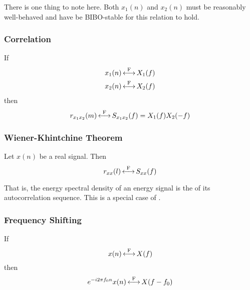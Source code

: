 \begin{remark*}
  There is one thing to note here.
  Both $x_{1}(n)$ and $x_{2}(n)$ must be reasonably well-behaved and have be BIBO-stable for this relation to hold.
\end{remark*}

\subsubsection{Correlation}\label{subsubsec:FourierTransformProperties-Correlation}
If
\begin{equation*}
  \begin{aligned}
    x_{1}(n) &\operatorname{\overset{F}{\longleftrightarrow}} X_{1}(f) \\
    x_{2}(n) &\operatorname{\overset{F}{\longleftrightarrow}} X_{2}(f) \\
  \end{aligned}
\end{equation*}
then
\begin{equation}\label{eq:FourierTransformProperties-Correlation}
  r_{x_{1}x_{2}}(m) \operatorname{\overset{F}{\longleftrightarrow}} S_{x_{1}x_{2}}(f) = X_{1}(f)X_{2}(-f)
\end{equation}

\subsubsection{Wiener-Khintchine Theorem}\label{subsubsec:FourierTransformProperties-WienerKhintchineTheorem}
Let $x(n)$ be a real signal. Then
\begin{equation}\label{eq:FourierTransformProperties-WienerKhintchineTheorem}
  r_{xx}(l) \operatorname{\overset{F}{\longleftrightarrow}} S_{xx}(f)
\end{equation}

That is, the energy spectral density of an energy signal is the  of its autocorrelation sequence. This is a special case of .

\subsubsection{Frequency Shifting}\label{subsubsec:FourierTransformProperties-FrequencyShifting}
If
\begin{equation*}
  x(n) \operatorname{\overset{F}{\longleftrightarrow}} X(f)
\end{equation*}
then
\begin{equation}\label{eq:FourierTransformProperties-FrequencyShifting}
  e^{-i 2 \pi f_{0} n}x(n) \operatorname{\overset{F}{\longleftrightarrow}} X(f - f_{0})
\end{equation}

